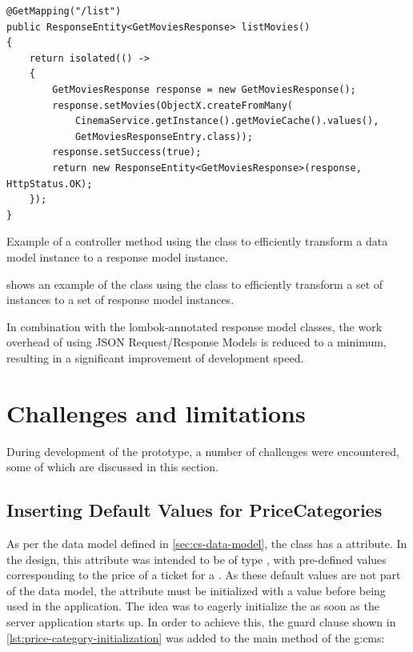 \begin{listing}[H]
\begin{verbatim}
@GetMapping("/list")
public ResponseEntity<GetMoviesResponse> listMovies() 
{
    return isolated(() -> 
    {
        GetMoviesResponse response = new GetMoviesResponse();
        response.setMovies(ObjectX.createFromMany(
            CinemaService.getInstance().getMovieCache().values(), 
            GetMoviesResponseEntry.class));
        response.setSuccess(true);
        return new ResponseEntity<GetMoviesResponse>(response, HttpStatus.OK);
    });
}
\end{verbatim}
\caption{Example of a controller method using the  class to efficiently transform a data model instance to a response model instance.}
\label{lst:reflective-object-mapping-example}
\end{listing}

 shows an example of the  class using the  class to efficiently transform a set of  instances to a set of  response model instances.

In combination with the lombok-annotated response model classes, the work overhead of using JSON Request/Response Models is reduced to a minimum, resulting in a significant improvement of development speed.

\section{Challenges and limitations}\label{sec:impl-challenges}

During development of the prototype, a number of challenges were encountered, some of which are discussed in this section.

\subsection{Inserting Default Values for PriceCategories}

As per the data model defined in \cref{sec:cs-data-model}, the  class has a  attribute. In the design, this attribute was intended to be of type , with pre-defined values corresponding to the price of a ticket for a . As these default values are not part of the data model, the  attribute must be initialized with a value before being used in the application. The idea was to eagerly initialize the  as soon as the server application starts up. In order to achieve this, the guard clause shown in \cref{lst:price-category-initialization} was added to the main method of the \gls{g:cms}:

